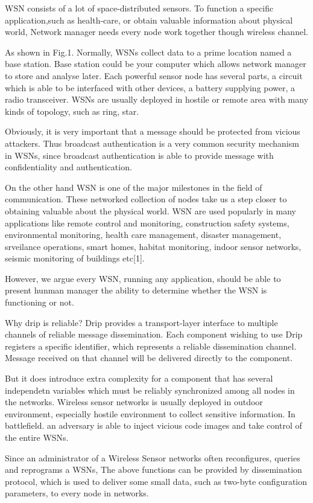 \documentclass[lnicst,sechang,a4paper]{svmultln}
\begin{document}
WSN consists of a lot of space-distributed sensors. To function a specific application,such as health-care, or obtain valuable information about physical world, Network manager needs every node work together though wireless channel.

As shown in Fig.1. Normally, WSNs collect data to a prime location named a base station. Base station could be your computer which allows network manager to store and analyse later. Each powerful sensor node has several parts, a circuit which is able to be interfaced with other devices, a battery supplying power, a radio transceiver. WSNs are usually deployed in hostile or remote area with many kinds of topology, such as ring, star. 

Obviously, it is very important that a message should be protected from vicious attackers. Thus broadcast authentication is a very common security mechanism in WSNs, since broadcast authentication is able to provide message with confidentiality and authentication. 

On the other hand 
WSN is one of the major milestones in the field of communication. These networked collection of nodes take us a step closer to obtaining valuable about the physical world. WSN are used popularly in many applications like remote control and monitoring, construction safety systems, environmental monitoring, health care management, disaster management, srveilance operations, smart homes, habitat monitoring, indoor sensor networks, seismic monitoring of buildings etc[1].

However, we argue every WSN, running any application, should be able to present hunman manager the ability to determine whether the WSN is functioning or not.

Why drip is reliable?
Drip provides a transport-layer interface to multiple channels of reliable message dissemination. Each component wishing to use Drip registers a specific identifier, which represents a reliable dissemination channel. Message received on that channel will be delivered directly to the component.

But it does introduce extra complexity for a component that has several independetn variables which must be reliably synchronized among all nodes in the networks.
Wireless sensor networks is usually deployed in outdoor environment, especially hostile environment to collect sensitive information. In battlefield. an adversary is able to inject vicious code images and take control of the entire WSNs.

Since an administrator of a Wireless Sensor networks often reconfigures, queries and reprograms a WSNs, The above functions can be provided by dissemination protocol, which is used to deliver some small data, such as two-byte configuration parameters, to every node in networks.
\end{document}
